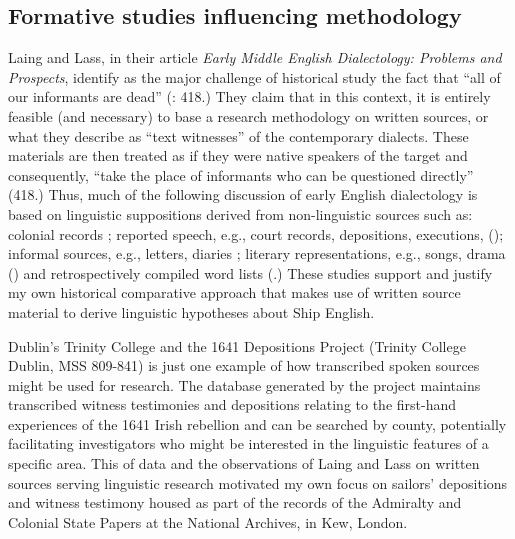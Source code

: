 \subsection{{Formative studies influencing methodology}}\label{sec:2.2.2}

Laing and Lass, in their article \textit{Early Middle English Dialectology: Problems and Prospects}, identify as the major challenge of historical  study the fact that “all of our informants are dead” (\citeyear*{LaingLass2006}: 418.) They claim that in this context, it is entirely feasible (and necessary) to base a research methodology on written sources, or what they describe as “text witnesses” of the contemporary dialects. These materials are then treated as if they were native speakers of the target  and consequently, “take the place of informants who can be questioned directly” (418.) Thus, much of the following discussion of early English dialectology is based on linguistic suppositions derived from non-linguistic sources such as: colonial records \citep{Maynor1988}; reported speech, e.g., court records, depositions, executions, (\citealt{Awbery1988,Tagliamonte2013}); informal sources, e.g., letters, diaries \citep{Tagliamonte2013}; literary representations, e.g., songs, drama (\citealt{Russell1883,Wright1967}) and retrospectively compiled word lists (\citealt{Wright1967,Smith1627}.) These studies support and justify my own historical comparative approach that makes use of written source material to derive linguistic hypotheses about Ship English. 

Dublin’s Trinity College and the 1641 Depositions Project (Trinity College Dublin, MSS 809-841) is just one example of how transcribed spoken sources might be used for research. The database generated by the project maintains transcribed witness testimonies and depositions relating to the first-hand experiences of the 1641 Irish rebellion and can be searched by county, potentially facilitating investigators who might be interested in the linguistic features of a specific area. This  of data and the observations of Laing and Lass on written sources serving linguistic research motivated my own focus on sailors’ depositions and witness testimony housed as part of the records of the Admiralty and Colonial State Papers at the National Archives, in Kew, London. 

